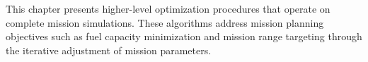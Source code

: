 This chapter presents higher-level optimization procedures that operate on complete mission simulations. These algorithms address mission planning objectives such as fuel capacity minimization and mission range targeting through the iterative adjustment of mission parameters.

